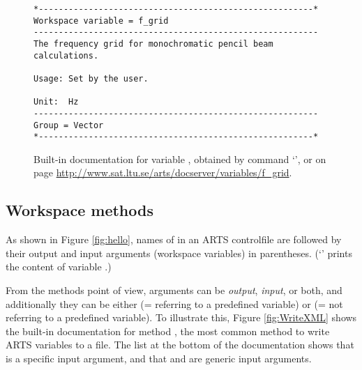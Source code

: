 \begin{figure}
\footnotesize
\begin{lstlisting}
*-------------------------------------------------------*
Workspace variable = f_grid
---------------------------------------------------------
The frequency grid for monochromatic pencil beam 
calculations.

Usage: Set by the user.
 
Unit:  Hz
---------------------------------------------------------
Group = Vector
*-------------------------------------------------------*
\end{lstlisting}
\caption{Built-in documentation for variable , obtained by
  command `', or on page
  \url{http://www.sat.ltu.se/arts/docserver/variables/f_grid}.} 
\label{fig:f_grid}
\end{figure}

\subsection{Workspace methods}
%
As shown in Figure \ref{fig:hello}, names of  in an ARTS
controlfile are followed by their output and input arguments (workspace
variables) in parentheses. (`' prints the content of variable
.)

From the methods point of view, arguments can be \emph{output},
\emph{input}, or both, and additionally they can be either
\emph{} (= referring to a predefined variable) or
\emph{} (= not referring to a predefined
variable). To illustrate this, Figure \ref{fig:WriteXML} shows the
built-in documentation for method , the most
common method to write ARTS variables to a file. The list at the
bottom of the documentation shows that
 is a specific input argument, and
that  and  are generic input
arguments.

